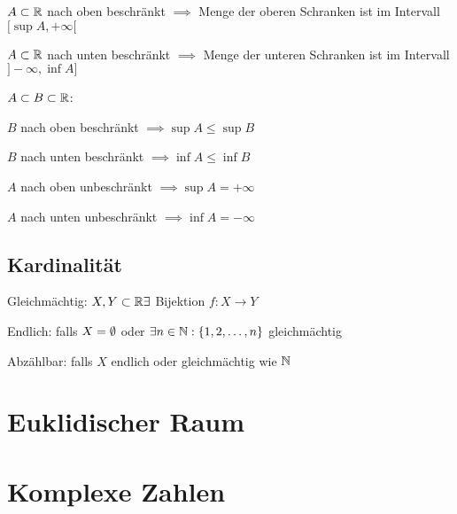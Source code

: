 \begin{compactenum}
    \item $A \subset \mathbb{R}$ nach oben beschränkt $\implies$ Menge der oberen Schranken ist  im Intervall $[\sup A, +\infty[$
    \item $A \subset \mathbb{R}$ nach unten beschränkt $\implies$ Menge der unteren Schranken ist  im Intervall $]-\infty, \inf A]$
\end{compactenum}

$A \subset  B \subset  \mathbb{R}$:
\begin{compactenum}
    \item $B$ nach oben beschränkt $\implies \sup A \le \sup B$
    \item $B$ nach unten beschränkt $\implies \inf A \le \inf B$
\end{compactenum}

\begin{compactenum}
    \item $A$ nach oben unbeschränkt $\implies \sup A = +\infty$
    \item $A$ nach unten unbeschränkt $\implies \inf A = -\infty$
\end{compactenum}

\subsection{Kardinalität}
\begin{compactdesc}
    \item[Gleichmächtig:] $X,Y \subset \mathbb{R} \exists$ Bijektion $f : X \to Y$
    \item[Endlich:] falls $X = \emptyset$ oder $\exists n \in \mathbb{N}: \{1, 2, \ldots, n\}$ gleichmächtig
    \item[Abzählbar:] falls $X$ endlich oder gleichmächtig wie $\mathbb{N}$
\end{compactdesc}

\section{Euklidischer Raum}
\section{Komplexe Zahlen}

